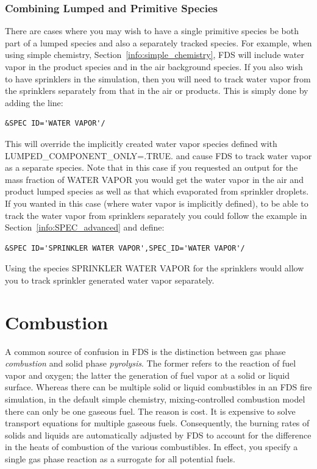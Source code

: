\documentclass[11pt]{book}
\begin{document}
\subsection{Combining Lumped and Primitive Species}

There are cases where you may wish to have a single primitive species be both part of a lumped species and also a separately tracked species.  For example, when using simple chemistry, Section~\ref{info:simple_chemistry}, FDS will include water vapor in the product species and in the air background species.  If you also wish to have sprinklers in the simulation, then you will need to track water vapor from the sprinklers separately from that in the air or products.  This is simply done by adding the line:

\begin{lstlisting}
&SPEC ID='WATER VAPOR'/
\end{lstlisting}
This will override the implicitly created water vapor species defined with {\ct LUMPED\_COMPONENT\_ONLY=.TRUE.} and cause FDS to track water vapor as a separate species.  Note that in this case if you requested an output for the mass fraction of {\ct WATER VAPOR} you would get the water vapor in the air and product lumped species as well as that which evaporated from sprinkler droplets.  If you wanted in this case (where water vapor is implicitly defined), to be able to track the water vapor from sprinklers separately you could follow the example in Section~\ref{info:SPEC_advanced} and define:

\begin{lstlisting}
&SPEC ID='SPRINKLER WATER VAPOR',SPEC_ID='WATER VAPOR'/
\end{lstlisting}
Using the species  {\ct SPRINKLER WATER VAPOR} for the sprinklers would allow you to track sprinkler generated water vapor separately.

\chapter{Combustion}

\label{chap:combustion}
\label{info:REAC}
\label{info:COMB}

A common source of confusion in FDS is the distinction between gas phase {\em combustion} and solid phase {\em pyrolysis}. The former refers to the reaction of fuel vapor and oxygen; the latter the generation of fuel vapor at a solid or liquid surface. Whereas there can be multiple solid or liquid combustibles in an FDS fire simulation, in the default simple chemistry, mixing-controlled combustion model there can only be one gaseous fuel. The reason is cost. It is expensive to solve transport equations for multiple gaseous fuels. Consequently, the burning rates of solids and liquids are automatically adjusted by FDS to account for the difference in the heats of combustion of the various combustibles. In effect, you specify a single gas phase reaction as a surrogate for all potential fuels.
\end{document}
